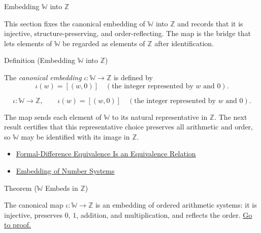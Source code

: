 \label{sec:embedding-w-into-z}

\begin{topicbox}{Embedding $\mathbb{W}$ into $\mathbb{Z}$}
\begin{exposition}
This section fixes the canonical embedding of $\mathbb{W}$ into $\mathbb{Z}$ and records that it is injective, structure-preserving, and order-reflecting. The map is the bridge that lets elements of $\mathbb{W}$ be regarded as elements of $\mathbb{Z}$ after identification.
\end{exposition}
\end{topicbox}
\begin{definitionbox}{Definition (Embedding $\mathbb{W}$ into $\mathbb{Z}$)}
\begin{definition}
\label{def:embedding-w-into-z}
The \emph{canonical embedding} $\iota:\mathbb{W}\to \mathbb{Z}$ is defined by
\[
\iota(w)=[(w,0)] \quad(\text{the integer represented by } w \text{ and } 0).
\]
\end{definition}
\end{definitionbox}
\begin{remark*}
\[
\iota:\mathbb{W}\to \mathbb{Z},\qquad \iota(w)=[(w,0)] \quad(\text{the integer represented by } w \text{ and } 0).
\]
\end{remark*}
\begin{remark*}[Interpretation]
The map sends each element of $\mathbb{W}$ to its natural representative in $\mathbb{Z}$. The next result certifies that this representative choice preserves all arithmetic and order, so $\mathbb{W}$ may be identified with its image in $\mathbb{Z}$.
\end{remark*}
\begin{dependencies}
\begin{itemize}
  \item \hyperref[thm:formal-difference-equivalence-relation]{Formal-Difference Equivalence Is an Equivalence Relation}
  \item \hyperref[def:number-system-embedding]{Embedding of Number Systems}
\end{itemize}
\end{dependencies}
\begin{theorembox}{Theorem ($\mathbb{W}$ Embeds in $\mathbb{Z}$)}
\begin{theorem}
\label{thm:w-embeds-in-z}
The canonical map $\iota:\mathbb{W}\to \mathbb{Z}$ is an embedding of ordered arithmetic systems: it is injective, preserves $0$, $1$, addition, and multiplication, and reflects the order.
\hyperref[prf:w-embeds-in-z]{Go to proof.}
\end{theorem}
\end{theorembox}
